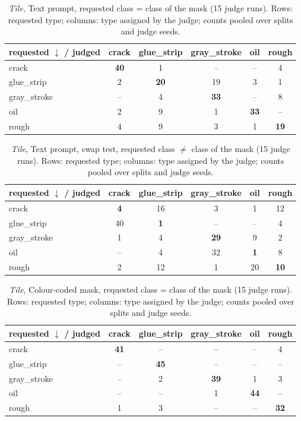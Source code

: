 \begin{table}[ht]\centering\footnotesize
\caption{\textit{Tile}, Text prompt, requested class = class of the mask (15 judge runs). Rows: requested type; columns: type assigned by the judge; counts pooled over splits and judge seeds.}
\label{tab:conf_textfix_heldout}
\begin{tabular}{@{}lccccc@{}}\toprule
requested $\downarrow$ / judged & crack & glue\_strip & gray\_stroke & oil & rough \\\midrule
crack & \textbf{40} & 1 & -- & -- & 4 \\
glue\_strip & 2 & \textbf{20} & 19 & 3 & 1 \\
gray\_stroke & -- & 4 & \textbf{33} & -- & 8 \\
oil & 2 & 9 & 1 & \textbf{33} & -- \\
rough & 4 & 9 & 3 & 1 & \textbf{19} \\
\bottomrule\end{tabular}\end{table}
\begin{table}[ht]\centering\footnotesize
\caption{\textit{Tile}, Text prompt, swap test, requested class $\neq$ class of the mask (15 judge runs). Rows: requested type; columns: type assigned by the judge; counts pooled over splits and judge seeds.}
\label{tab:conf_textfix_swap}
\begin{tabular}{@{}lccccc@{}}\toprule
requested $\downarrow$ / judged & crack & glue\_strip & gray\_stroke & oil & rough \\\midrule
crack & \textbf{4} & 16 & 3 & 1 & 12 \\
glue\_strip & 40 & \textbf{1} & -- & -- & 4 \\
gray\_stroke & 1 & 4 & \textbf{29} & 9 & 2 \\
oil & -- & 4 & 32 & \textbf{1} & 8 \\
rough & 2 & 12 & 1 & 20 & \textbf{10} \\
\bottomrule\end{tabular}\end{table}
\begin{table}[ht]\centering\footnotesize
\caption{\textit{Tile}, Colour-coded mask, requested class = class of the mask (15 judge runs). Rows: requested type; columns: type assigned by the judge; counts pooled over splits and judge seeds.}
\label{tab:conf_colorfix_heldout}
\begin{tabular}{@{}lccccc@{}}\toprule
requested $\downarrow$ / judged & crack & glue\_strip & gray\_stroke & oil & rough \\\midrule
crack & \textbf{41} & -- & -- & -- & 4 \\
glue\_strip & -- & \textbf{45} & -- & -- & -- \\
gray\_stroke & -- & 2 & \textbf{39} & 1 & 3 \\
oil & -- & -- & 1 & \textbf{44} & -- \\
rough & 1 & 3 & -- & -- & \textbf{32} \\
\bottomrule\end{tabular}\end{table}
